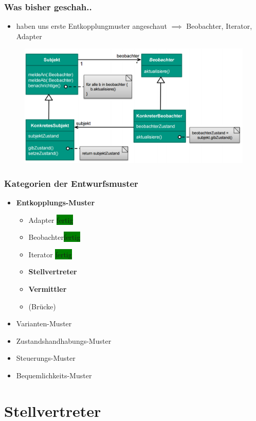 \documentclass[18pt]{beamer}
\begin{document}
	\begin{frame}
		\frametitle{Was bisher geschah..}
		\begin{itemize}
			\item haben uns erste Entkopplungmuster angeschaut
			\linebreak $\implies$ Beobachter, Iterator, Adapter
		\end{itemize}
		\begin{figure}
			\includegraphics[scale=0.35]{./pics/tut3/obs.png}
		\end{figure}
	\end{frame}

	\begin{frame}
		\frametitle{Kategorien der Entwurfsmuster}
		\begin{itemize}
			\item \textbf{Entkopplungs-Muster}
			\begin{itemize}
				\item Adapter \colorbox{green}{fertig}
				\item Beobachter\colorbox{green}{fertig}
				\item Iterator \colorbox{green}{fertig}
				\item \textbf{Stellvertreter}
				\item \textbf{Vermittler}
				\item (Brücke)
			\end{itemize}
			\item Varianten-Muster
			\item Zustandshandhabungs-Muster
			\item Steuerungs-Muster
			\item Bequemlichkeits-Muster
		\end{itemize}
	\end{frame}


\section{Stellvertreter}
\end{document}
